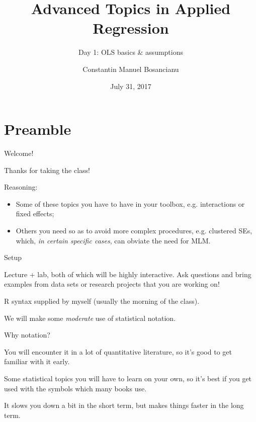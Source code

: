 \documentclass[12pt,english,pdf,xcolor=dvipsnames,aspectratio=169,handout]{beamer}\usepackage[]{graphicx}\usepackage[]{xcolor}
\title{Advanced Topics in Applied Regression}
\subtitle{Day 1: OLS basics \& assumptions}
\author{Constantin Manuel Bosancianu}
\institute{Doctoral School of Political Science \\ Central European University, Budapest\\\href{mailto:bosancianu@icloud.com}{bosancianu@icloud.com}}
\date{July 31, 2017}
\begin{document}
\maketitle
\section{Preamble}




\begin{frame}{Welcome!}

  Thanks for taking the class!\bigskip

  Reasoning:

  \begin{itemize}
  \item Some of these topics you have to have in your toolbox, e.g. interactions or fixed effects;
  \item Others you need so as to avoid more complex procedures, e.g. clustered SEs, which, \textit{in certain specific cases}, can obviate the need for MLM.
  \end{itemize}
  
\end{frame}




\begin{frame}{Setup}

  Lecture + lab, both of which will be highly interactive. Ask questions and bring examples from data sets or research projects that you are working on!\bigskip

  R syntax supplied by myself (usually the morning of the class).\bigskip

  We will make some \textit{moderate} use of statistical notation.
\end{frame}




\begin{frame}{Why notation?}

  You will encounter it in a lot of quantitative literature, so it's good to get familiar with it early.\bigskip

  Some statistical topics you will have to learn on your own, so it's best if you get used with the symbols which many books use.\bigskip

  It slows you down a bit in the short term, but makes things faster in the long term.

\end{frame}
\end{document}
